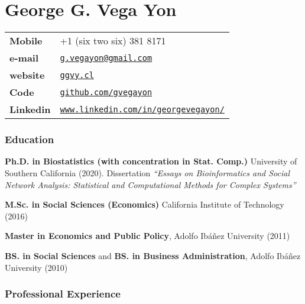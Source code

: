 \documentclass[letterpaper, 11pt]{article}
\def\name{George G. Vega Yon}
\renewenvironment{itemize}{
  \begin{list}{}{
    \setlength{\leftmargin}{0.45cm}
  }
}{
  \end{list}
}
\begin{document}
\part*{\name}



\begin{minipage}{0.50\linewidth}
  \begin{tabular}{>{\bfseries}p{.2\linewidth}p{.79\linewidth}}
    Mobile & +1 (six two six) 381 8171 \\
    e-mail & \href{mailto:g.vegayon@gmail.com}{\tt g.vegayon@gmail.com} \\
    website & \href{https://ggvy.cl}{\tt ggvy.cl} \\
    Code & \href{https://github.com/gvegayon}{\tt github.com/gvegayon}\\
    Linkedin & \href{https://www.linkedin.com/in/georgevegayon/}{\tt www.linkedin.com/in/georgevegayon/}
  \end{tabular}
\end{minipage}


\section*{Education}

\begin{itemize}
\item 
{\bf Ph.D. in Biostatistics (with concentration in Stat. Comp.)} University of Southern California (2020). Dissertation \emph{``Essays on Bioinformatics and Social Network Analysis: Statistical and Computational Methods for Complex Systems''}

{\bf M.Sc. in Social Sciences (Economics)} California Institute of Technology (2016)

{\bf Master in Economics and Public Policy}, Adolfo Ib\'a\~nez University (2011)

{\bf BS. in Social Sciences} and {\bf BS. in Business Administration}, Adolfo Ib\'a\~nez University (2010)
\end{itemize}

\section*{Professional Experience}
\end{document}
